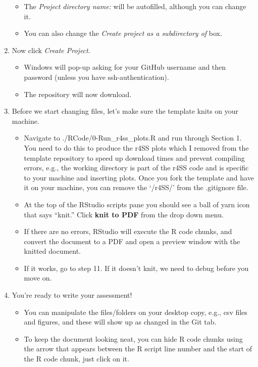 \documentclass[12pt,]{article}
\providecommand{\tightlist}{%
  \setlength{\itemsep}{0pt}\setlength{\parskip}{0pt}}
\begin{document}
\begin{enumerate}
  \begin{itemize}
  \tightlist
  \item
    The \emph{Project directory name:} will be autofilled, although you
    can change it.
  \item
    You can also change the \emph{Create project as a subdirectory of}
    box.
  \end{itemize}
\item
  Now click \emph{Create Project}.

  \begin{itemize}
  \tightlist
  \item
    Windows will pop-up asking for your GitHub username and then
    password (unless you have ssh-authentication).
  \item
    The repository will now download.
  \end{itemize}
\item
  Before we start changing files, let's make sure the template knits on
  your machine.

  \begin{itemize}
  \tightlist
  \item
    Navigate to ./RCode/0-Run\_r4ss\_plots.R and run through Section 1.
    You need to do this to produce the r4SS plots which I removed from
    the template repository to speed up download times and prevent
    compiling errors, e.g., the working directory is part of the r4SS
    code and is specific to your machine and inserting plots. Once you
    fork the template and have it on your machine, you can remove the
    `/r4SS/' from the .gitignore file.
  \item
    At the top of the RStudio scripts pane you should see a ball of yarn
    icon that says ``knit.'' Click \textbf{knit to PDF} from the drop
    down menu.
  \item
    If there are no errors, RStudio will execute the R code chunks, and
    convert the document to a PDF and open a preview window with the
    knitted document.
  \item
    If it works, go to step 11. If it doesn't knit, we need to debug
    before you move on.
  \end{itemize}
\item
  You're ready to write your assessment!

  \begin{itemize}
  \tightlist
  \item
    You can manipulate the files/folders on your desktop copy, e.g., csv
    files and figures, and these will show up as changed in the Git tab.
  \item
    To keep the document looking neat, you can hide R code chunks using
    the arrow that appears between the R script line number and the
    start of the R code chunk, just click on it.
  \end{itemize}
\end{enumerate}
\end{document}
